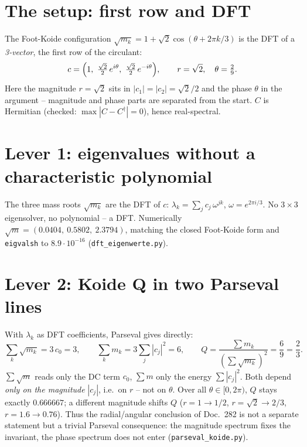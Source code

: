 \section{The setup: first row and DFT}
The Foot-Koide configuration $\sqrt{m_k}=1+\sqrt2\cos(\theta+2\pi k/3)$ is the DFT of a \emph{3-vector},
the first row of the circulant:
\[
  c=\Bigl(1,\ \tfrac{\sqrt2}{2}\,e^{i\theta},\ \tfrac{\sqrt2}{2}\,e^{-i\theta}\Bigr),
  \qquad r=\sqrt2,\quad \theta=\tfrac{2}{9}.
\]
Here the magnitude $r=\sqrt2$ sits in $|c_1|=|c_2|=\sqrt2/2$ and the phase $\theta$ in the argument --
magnitude and phase parts are separated from the start. $C$ is Hermitian (checked:
$\max|C-C^{\dagger}|=0$), hence real-spectral.

\section{Lever 1: eigenvalues without a characteristic polynomial}
The three mass roots $\sqrt{m_k}$ are the DFT of $c$: $\lambda_k=\sum_{j}c_j\,\omega^{jk}$,
$\omega=e^{2\pi i/3}$. No $3\times3$ eigensolver, no polynomial -- a DFT. Numerically
$\sqrt m=(0{.}0404,\ 0{.}5802,\ 2{.}3794)$, matching the closed Foot-Koide form and \texttt{eigvalsh}
to $8{.}9\cdot10^{-16}$ (\texttt{dft\_eigenwerte.py}).

\section{Lever 2: Koide Q in two Parseval lines}
With $\lambda_k$ as DFT coefficients, Parseval gives directly:
\[
  \sum_k \sqrt{m_k}=3\,c_0=3,\qquad \sum_k m_k=3\sum_j|c_j|^2=6,
  \qquad Q=\frac{\sum m_k}{(\sum\sqrt{m_k})^2}=\frac{6}{9}=\frac{2}{3}.
\]
$\sum\sqrt m$ reads only the DC term $c_0$, $\sum m$ only the energy $\sum|c_j|^2$. Both depend
\emph{only on the magnitude} $|c_j|$, i.e.\ on $r$ -- not on $\theta$. Over all $\theta\in[0,2\pi)$,
$Q$ stays exactly $0{.}666667$; a different magnitude shifts $Q$ ($r=1\!\to\!1/2$,
$r=\sqrt2\!\to\!2/3$, $r=1{.}6\!\to\!0{.}76$). Thus the radial/angular conclusion of Doc.~282 is not a
separate statement but a trivial Parseval consequence: the magnitude spectrum fixes the invariant, the
phase spectrum does not enter (\texttt{parseval\_koide.py}).

